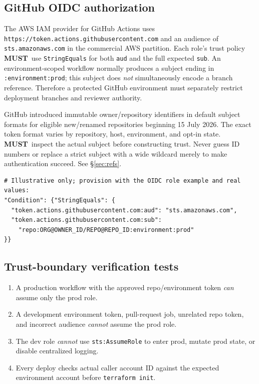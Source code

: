 \documentclass[10pt,letterpaper]{article}
\newcommand{\must}{\textbf{MUST}}
\begin{document}
\subsection{GitHub OIDC authorization}
The AWS IAM provider for GitHub Actions uses \texttt{https://token.actions.githubusercontent.com} and an audience of \texttt{sts.amazonaws.com} in the commercial AWS partition. Each role's trust policy \must\ use \texttt{StringEquals} for both \texttt{aud} and the full expected \texttt{sub}. An environment-scoped workflow normally produces a subject ending in \texttt{:environment:prod}; this subject does \emph{not} simultaneously encode a branch reference. Therefore a protected GitHub environment must separately restrict deployment branches and reviewer authority.

GitHub introduced immutable owner/repository identifiers in default subject formats for eligible new/renamed repositories beginning 15 July 2026. The exact token format varies by repository, host, environment, and opt-in state. \must\ inspect the actual subject before constructing trust. Never guess ID numbers or replace a strict subject with a wide wildcard merely to make authentication succeed. See \S\ref{sec:refs}.
\begin{verbatim}
# Illustrative only; provision with the OIDC role example and real values:
"Condition": {"StringEquals": {
  "token.actions.githubusercontent.com:aud": "sts.amazonaws.com",
  "token.actions.githubusercontent.com:sub":
    "repo:ORG@OWNER_ID/REPO@REPO_ID:environment:prod"
}}
\end{verbatim}
\subsection{Trust-boundary verification tests}
\begin{enumerate}
\item A production workflow with the approved repo/environment token \emph{can} assume only the prod role.
\item A development environment token, pull-request job, unrelated repo token, and incorrect audience \emph{cannot} assume the prod role.
\item The dev role \emph{cannot} use \texttt{sts:AssumeRole} to enter prod, mutate prod state, or disable centralized logging.
\item Every deploy checks actual caller account ID against the expected environment account before \texttt{terraform init}.
\end{enumerate}
\end{document}
